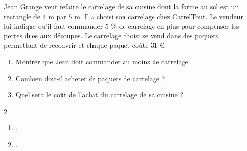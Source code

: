 \begin{exercice*}[Carrelage]
    Jean Grange veut refaire le carrelage de sa cuisine dont la forme au sol est un 
    rectangle de $4$ m par $5$ m. Il a choisi son carrelage chez CarrelTout. Le vendeur
    lui indique qu'il faut commander $5$ \% de carrelage en plus pour compenser les
    pertes dues aux découpes. Le carrelage choisi se vend dans des paquets permettant de 
    recouvrir  et chaque paquet coûte $31$ \euro.    
    \begin{enumerate}
        \item Montrer que Jean doit commander au moins  de carrelage.
        \item Combien doit-il acheter de paquets de carrelage ?
        \item Quel sera le coût de l'achat du carrelage de sa cuisine ?    
    \end{enumerate}
\end{exercice*}
\begin{corrige}
    \phantom{rrr}    
    \begin{multicols}2
        \begin{enumerate}
            \item .
            \item .
        \end{enumerate}
    \end{multicols}
\end{corrige}

